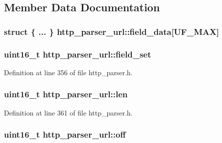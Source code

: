 \subsection{Member Data Documentation}
\hypertarget{structhttp__parser__url_a1b8deef68bcf0e412d56851f9dd4544b}{
\subsubsection[{field\-\_\-data}]{\setlength{\rightskip}{0pt plus 5cm}struct \{ ... \}   http\-\_\-parser\-\_\-url\-::field\-\_\-data\mbox{[}{\bf U\-F\-\_\-\-M\-A\-X}\mbox{]}}}\label{structhttp__parser__url_a1b8deef68bcf0e412d56851f9dd4544b}
\hypertarget{structhttp__parser__url_a77af61a480f11c41938810dd76ca49eb}{
\subsubsection[{field\-\_\-set}]{\setlength{\rightskip}{0pt plus 5cm}uint16\-\_\-t http\-\_\-parser\-\_\-url\-::field\-\_\-set}}\label{structhttp__parser__url_a77af61a480f11c41938810dd76ca49eb}


Definition at line 356 of file http\-\_\-parser.\-h.

\hypertarget{structhttp__parser__url_a60fb784a989dd5a95e5bd19d468d22c7}{
\subsubsection[{len}]{\setlength{\rightskip}{0pt plus 5cm}uint16\-\_\-t http\-\_\-parser\-\_\-url\-::len}}\label{structhttp__parser__url_a60fb784a989dd5a95e5bd19d468d22c7}


Definition at line 361 of file http\-\_\-parser.\-h.

\hypertarget{structhttp__parser__url_a6510826f3aa9a1100ac5f714323edeb1}{
\subsubsection[{off}]{\setlength{\rightskip}{0pt plus 5cm}uint16\-\_\-t http\-\_\-parser\-\_\-url\-::off}}\label{structhttp__parser__url_a6510826f3aa9a1100ac5f714323edeb1}


